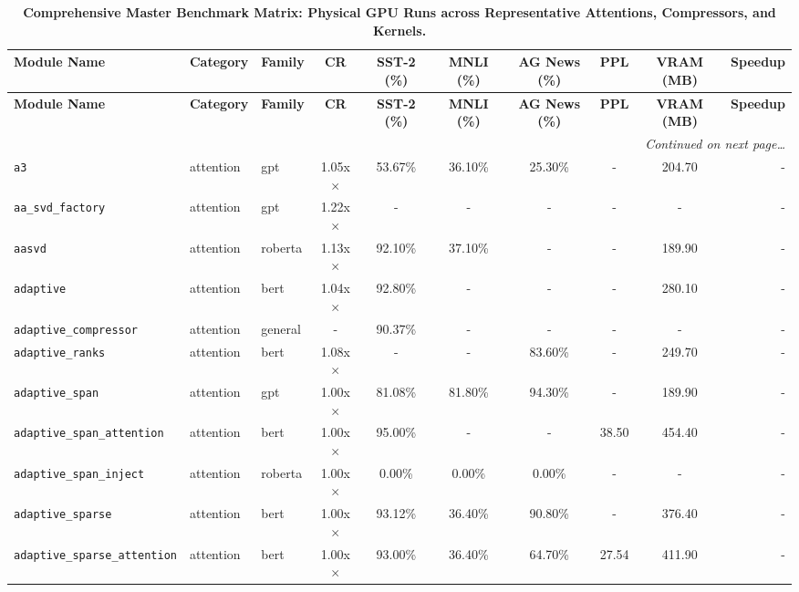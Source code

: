 \begin{center}
\tiny
\setlength{\tabcolsep}{2.5pt}
\begin{longtable}{lllccccccr}
\caption{\textbf{Comprehensive Master Benchmark Matrix: Physical GPU Runs across Representative Attentions, Compressors, and Kernels.}} \label{tab:master_benchmark_matrix} \\
\toprule
\textbf{Module Name} & \textbf{Category} & \textbf{Family} & \textbf{CR} & \textbf{SST-2 (\%)} & \textbf{MNLI (\%)} & \textbf{AG News (\%)} & \textbf{PPL} & \textbf{VRAM (MB)} & \textbf{Speedup} \\
\midrule
\endfirsthead
\toprule
\textbf{Module Name} & \textbf{Category} & \textbf{Family} & \textbf{CR} & \textbf{SST-2 (\%)} & \textbf{MNLI (\%)} & \textbf{AG News (\%)} & \textbf{PPL} & \textbf{VRAM (MB)} & \textbf{Speedup} \\
\midrule
\endhead
\midrule
\multicolumn{10}{r}{\emph{Continued on next page\dots}} \\
\endfoot
\bottomrule
\endlastfoot
\texttt{a3} & attention & gpt & 1.05x$\times$ & 53.67\% & 36.10\% & 25.30\% & - & 204.70 & - \\
\texttt{aa\_svd\_factory} & attention & gpt & 1.22x$\times$ & - & - & - & - & - & - \\
\texttt{aasvd} & attention & roberta & 1.13x$\times$ & 92.10\% & 37.10\% & - & - & 189.90 & - \\
\texttt{adaptive} & attention & bert & 1.04x$\times$ & 92.80\% & - & - & - & 280.10 & - \\
\texttt{adaptive\_compressor} & attention & general & - & 90.37\% & - & - & - & - & - \\
\texttt{adaptive\_ranks} & attention & bert & 1.08x$\times$ & - & - & 83.60\% & - & 249.70 & - \\
\texttt{adaptive\_span} & attention & gpt & 1.00x$\times$ & 81.08\% & 81.80\% & 94.30\% & - & 189.90 & - \\
\texttt{adaptive\_span\_attention} & attention & bert & 1.00x$\times$ & 95.00\% & - & - & 38.50 & 454.40 & - \\
\texttt{adaptive\_span\_inject} & attention & roberta & 1.00x$\times$ & 0.00\% & 0.00\% & 0.00\% & - & - & - \\
\texttt{adaptive\_sparse} & attention & bert & 1.00x$\times$ & 93.12\% & 36.40\% & 90.80\% & - & 376.40 & - \\
\texttt{adaptive\_sparse\_attention} & attention & bert & 1.00x$\times$ & 93.00\% & 36.40\% & 64.70\% & 27.54 & 411.90 & - \\

\end{longtable}
\end{center}
